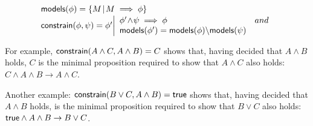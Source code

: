 \begin{equation}
\label{eq:constrain}
\begin{array}{l}
\textsf{models}(\phi) = \{ M \!\mid\! M \implies \phi \}
\\[0.5mm]
\textsf{constrain}(\phi,\psi) = \phi' \bigg|
	\begin{array}{lr}
	\phi' \!\land\! \psi \implies \phi & and \\
	\textsf{models}(\phi') = \textsf{models}(\phi) \backslash \textsf{models}(\psi) & 
	\end{array}
\end{array}
\end{equation}

For example, $\textsf{constrain}(A \land C, A \land B)=C$ shows that, having decided that $A \land B$ holds, $C$ is the minimal proposition required to show that $A \land C$ also holds: $C \land A \land B \to A \land C$.

Another example: $\textsf{constrain}(B \lor C, A \land B)=\textsf{true}$ shows that, having decided that $A \land B$ holds,  is the minimal proposition required to show that $B \lor C$ also holds: $\textsf{true} \land A \land B \to B \lor C$.
